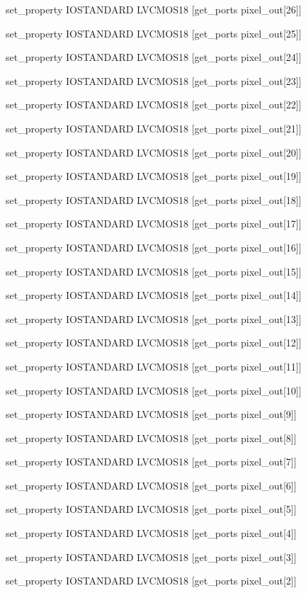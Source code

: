 set\_property IOSTANDARD LVCMOS18 [get\_ports {pixel\_out[26]}]

set\_property IOSTANDARD LVCMOS18 [get\_ports {pixel\_out[25]}]

set\_property IOSTANDARD LVCMOS18 [get\_ports {pixel\_out[24]}]

set\_property IOSTANDARD LVCMOS18 [get\_ports {pixel\_out[23]}]

set\_property IOSTANDARD LVCMOS18 [get\_ports {pixel\_out[22]}]

set\_property IOSTANDARD LVCMOS18 [get\_ports {pixel\_out[21]}]

set\_property IOSTANDARD LVCMOS18 [get\_ports {pixel\_out[20]}]

set\_property IOSTANDARD LVCMOS18 [get\_ports {pixel\_out[19]}]

set\_property IOSTANDARD LVCMOS18 [get\_ports {pixel\_out[18]}]

set\_property IOSTANDARD LVCMOS18 [get\_ports {pixel\_out[17]}]

set\_property IOSTANDARD LVCMOS18 [get\_ports {pixel\_out[16]}]

set\_property IOSTANDARD LVCMOS18 [get\_ports {pixel\_out[15]}]

set\_property IOSTANDARD LVCMOS18 [get\_ports {pixel\_out[14]}]

set\_property IOSTANDARD LVCMOS18 [get\_ports {pixel\_out[13]}]

set\_property IOSTANDARD LVCMOS18 [get\_ports {pixel\_out[12]}]

set\_property IOSTANDARD LVCMOS18 [get\_ports {pixel\_out[11]}]

set\_property IOSTANDARD LVCMOS18 [get\_ports {pixel\_out[10]}]

set\_property IOSTANDARD LVCMOS18 [get\_ports {pixel\_out[9]}]

set\_property IOSTANDARD LVCMOS18 [get\_ports {pixel\_out[8]}]

set\_property IOSTANDARD LVCMOS18 [get\_ports {pixel\_out[7]}]

set\_property IOSTANDARD LVCMOS18 [get\_ports {pixel\_out[6]}]

set\_property IOSTANDARD LVCMOS18 [get\_ports {pixel\_out[5]}]

set\_property IOSTANDARD LVCMOS18 [get\_ports {pixel\_out[4]}]

set\_property IOSTANDARD LVCMOS18 [get\_ports {pixel\_out[3]}]

set\_property IOSTANDARD LVCMOS18 [get\_ports {pixel\_out[2]}]

